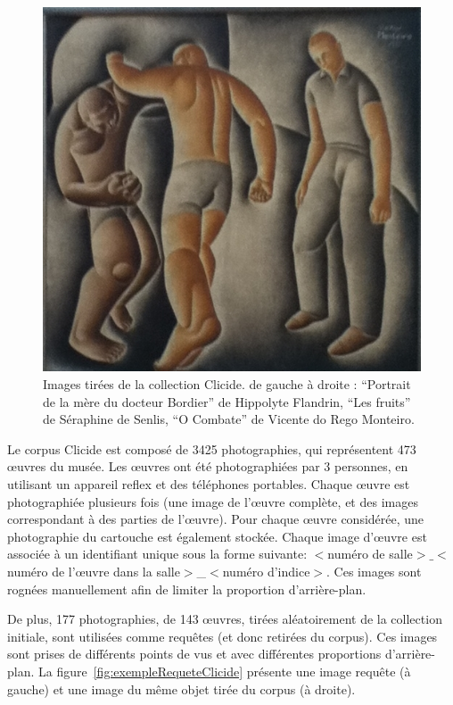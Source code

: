 \begin{figure}[htb]
\begin{minipage}[c]{.3\linewidth}
   \end{minipage} \hfill
   \begin{minipage}[c]{.3\linewidth}
      \includegraphics[width=\linewidth]{figures/35G-4.JPG}
   \end{minipage} \hfill
    \caption{Images tirées de la collection Clicide. de gauche à droite : ``Portrait de la mère du docteur Bordier'' de Hippolyte Flandrin, ``Les fruits'' de Séraphine de Senlis, ``O Combate'' de Vicente do Rego Monteiro. }
    \label{fig:exempleClicide}
\end{figure}

Le corpus Clicide est composé de 3425 photographies, qui représentent 473 œuvres du musée. 
Les œuvres ont été photographiées par 3 personnes, en utilisant un appareil reflex et des téléphones portables. Chaque œuvre est photographiée plusieurs fois (une image de l'œuvre complète, et des images correspondant à des parties de l'œuvre). 
Pour chaque œuvre considérée, une photographie du cartouche est également stockée. 
Chaque image d'œuvre est associée à un identifiant unique sous la forme suivante: $<$numéro de salle$>$$\_$$<$numéro de l'œuvre dans la salle$>$\_$<$numéro d'indice$>$. Ces images sont rognées manuellement afin de limiter la proportion d'arrière-plan.

De plus, 177 photographies, de 143 œuvres, tirées aléatoirement de la collection initiale, sont utilisées comme requêtes (et donc retirées du corpus). 
Ces images sont prises de différents points de vus et avec différentes proportions d'arrière-plan.
La figure~\ref{fig:exempleRequeteClicide} présente une image requête (à gauche) et une image du même objet tirée du corpus (à droite).

